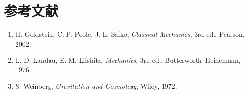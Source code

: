 \documentclass[UTF8,a4paper,11pt]{ctexart}
\begin{document}
\section*{参考文献}
\begin{enumerate}
  \item H. Goldstein, C. P. Poole, J. L. Safko,
        \emph{Classical Mechanics}, 3rd ed., Pearson, 2002.
  \item L. D. Landau, E. M. Lifshitz,
        \emph{Mechanics}, 3rd ed., Butterworth--Heinemann, 1976.
  \item S. Weinberg,
        \emph{Gravitation and Cosmology}, Wiley, 1972.
\end{enumerate}
\end{document}
